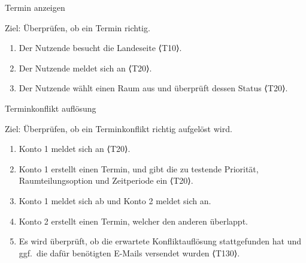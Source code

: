 \begin{scenario}{40}{Termin anzeigen}
  \item[Ziel:] Überprüfen, ob ein Termin richtig.
  \begin{enumerate}
    \item Der Nutzende besucht die Landeseite ⟨T10⟩.
    \item Der Nutzende meldet sich an ⟨T20⟩.
    \item Der Nutzende wählt einen Raum aus und überprüft dessen Status ⟨T20⟩.
  \end{enumerate}
\end{scenario}

\begin{scenario}{50}{Terminkonflikt auflösung}
  \item[Ziel:] Überprüfen, ob ein Terminkonflikt richtig aufgelöst wird.
  \begin{enumerate}
    \item Konto 1 meldet sich an ⟨T20⟩.
    \item Konto 1 erstellt einen Termin, und gibt die zu testende Priorität, Raumteilungsoption und Zeitperiode ein ⟨T20⟩.
    \item Konto 1 meldet sich ab und Konto 2 meldet sich an.
    \item Konto 2 erstellt einen Termin, welcher den anderen überlappt.
    \item Es wird überprüft, ob die erwartete Konfliktauflösung stattgefunden hat und ggf.\ die dafür benötigten E-Mails versendet wurden ⟨T130⟩.
  \end{enumerate}
\end{scenario}







